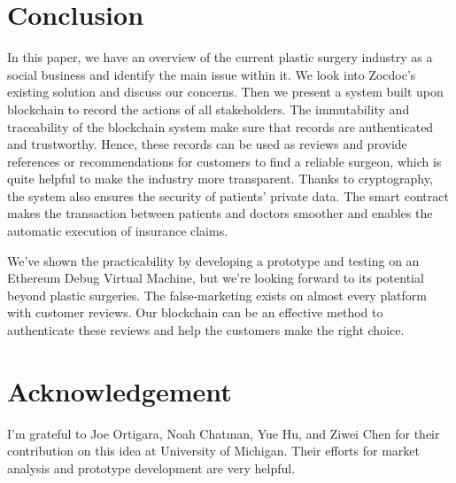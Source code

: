 \documentclass{article}
\begin{document}
\section{Conclusion}
In this paper, we have an overview of the current plastic surgery industry as a social business and identify the main issue within it. We look into Zocdoc's existing solution and discuss our concerns. Then we present a system built upon blockchain to record the actions of all stakeholders. The immutability and traceability of the blockchain system make sure that records are authenticated and trustworthy. Hence, these records can be used as reviews and provide references or recommendations for customers to find a reliable surgeon, which is quite helpful to make the industry more transparent. Thanks to cryptography, the system also ensures the security of patients' private data. The smart contract makes the transaction between patients and doctors smoother and enables the automatic execution of insurance claims.
\par We've shown the practicability by developing a prototype and testing on an Ethereum Debug Virtual Machine, but we're looking forward to its potential beyond plastic surgeries. The false-marketing exists on almost every platform with customer reviews. Our blockchain can be an effective method to authenticate these reviews and help the customers make the right choice.
\section{Acknowledgement}
I'm grateful to Joe Ortigara, Noah Chatman, Yue Hu, and Ziwei Chen for their contribution on this idea at University of Michigan. Their efforts for market analysis and prototype development are very helpful.


\end{document}
